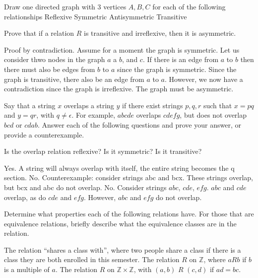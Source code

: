\documentclass[solution, letterpaper]{cs20inclass}
\begin{document}
\problem
Draw one directed graph with 3 vertices $A, B, C$ for each of the following relationships
\subproblem Reflexive
\subproblem Symmetric
\subproblem Antisymmetric
\subproblem Transitive


\begin{solution}



\end{solution}

\problem
Prove that if a relation $R$ is transitive and irreflexive, then it is asymmetric.

\begin{solution}
Proof by contradiction. Assume for a moment the graph is symmetric. Let us consider thwo nodes in the graph $a$ a $b$, and $c$. If there is an edge from $a$ to $b$  then there must also be edges from $b$ to $a$ since the graph is symmetric. Since the graph is transitive, there also be an edge from $a$ to $a$. However, we now have a contradiction since the graph is irreflexive. The graph must be asymmetric. 


\end{solution}

\problem Say that a string $x$ overlaps a string $y$ if there exist strings $p,q,r$ such that $x = pq$ and $y = qr$, with $q \neq \epsilon$. For example, $abcde$ overlaps $cdefg$, but does not overlap $bcd$ or $cdab$. Answer each of the following questions and prove your answer, or provide a counterexample.

\subproblem Is the overlap relation reflexive? 
\subproblem Is it symmetric?
\subproblem Is it transitive?

\begin{solution}
\subsolution Yes. A string will always overlap with itself, the entire string becomes the q section. 
\subsolution No. Counterexample: consider strings abc and bcx. These strings overlap, but bcx and abc do not overlap. 
\subsolution No. Consider strings $abc$, $cde$, $efg$. $abc$ and $cde$ overlap, as do $cde$ and $efg$. However, $abc$ and $efg$ do not overlap. 

 
\end{solution}

\problem Determine what properties each of the following relations have. For those that are equivalence relations, briefly describe what the equivalence classes are in the relation.

\subproblem The relation ``shares a class with'', where two people share a class if there is a class they are both enrolled in this semester.
\subproblem The relation $R$ on $\mathbb{Z}$, where $aRb$ if $b$ is a multiple of $a$.
\subproblem The relation $R$ on $\mathbb{Z} \times \mathbb{Z}$, with $(a,b)$ $R$ $(c,d)$ if $ad = bc$. 
\end{document}

